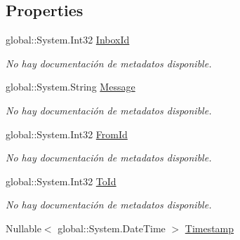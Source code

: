 \subsection*{Properties}
\begin{DoxyCompactItemize}
\item 
global\-::\-System.\-Int32 \hyperlink{class_microsoft_1_1_samples_1_1_kinect_1_1_basic_interactions_1_1_inboxes_a3906c9d8cdf9e77b228a265dc3412af3}{Inbox\-Id}
\begin{DoxyCompactList}\small\item\em No hay documentación de metadatos disponible. \end{DoxyCompactList}\item 
global\-::\-System.\-String \hyperlink{class_microsoft_1_1_samples_1_1_kinect_1_1_basic_interactions_1_1_inboxes_af7cafc1901910df731064251598c2f8e}{Message}
\begin{DoxyCompactList}\small\item\em No hay documentación de metadatos disponible. \end{DoxyCompactList}\item 
global\-::\-System.\-Int32 \hyperlink{class_microsoft_1_1_samples_1_1_kinect_1_1_basic_interactions_1_1_inboxes_a10e9fbc7bc14979fa5b8047ec9eec1c5}{From\-Id}
\begin{DoxyCompactList}\small\item\em No hay documentación de metadatos disponible. \end{DoxyCompactList}\item 
global\-::\-System.\-Int32 \hyperlink{class_microsoft_1_1_samples_1_1_kinect_1_1_basic_interactions_1_1_inboxes_a864dee98e466744a59027d73178247cf}{To\-Id}
\begin{DoxyCompactList}\small\item\em No hay documentación de metadatos disponible. \end{DoxyCompactList}\item 
Nullable$<$ global\-::\-System.\-Date\-Time $>$ \hyperlink{class_microsoft_1_1_samples_1_1_kinect_1_1_basic_interactions_1_1_inboxes_a4cd5a0e27cd3641cd70658a26791c16f}{Timestamp}

\end{DoxyCompactItemize}
